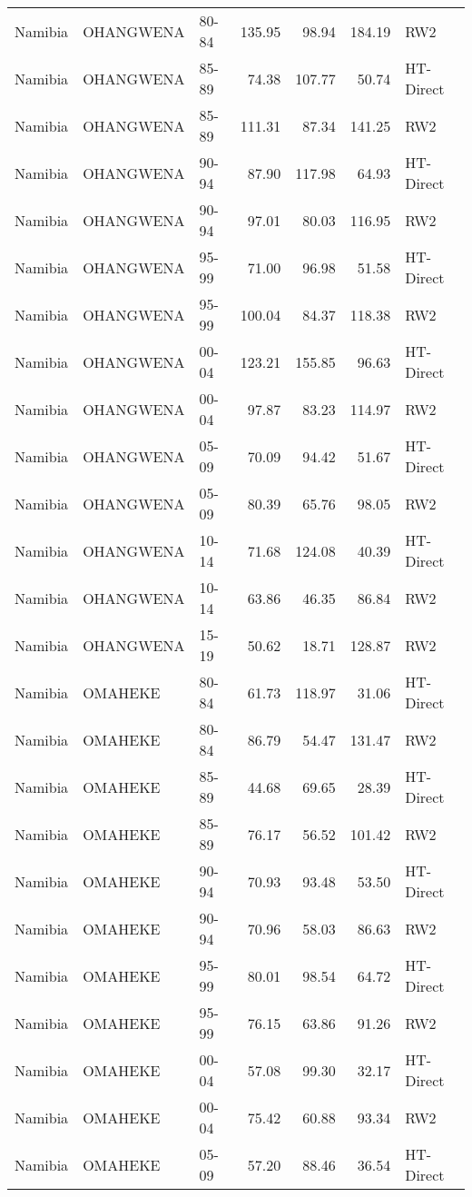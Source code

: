 \begin{longtable}{lllrrrl}
  Namibia & OHANGWENA & 80-84 & 135.95 & 98.94 & 184.19 & RW2 \\ 
  Namibia & OHANGWENA & 85-89 & 74.38 & 107.77 & 50.74 & HT-Direct \\ 
  Namibia & OHANGWENA & 85-89 & 111.31 & 87.34 & 141.25 & RW2 \\ 
  Namibia & OHANGWENA & 90-94 & 87.90 & 117.98 & 64.93 & HT-Direct \\ 
  Namibia & OHANGWENA & 90-94 & 97.01 & 80.03 & 116.95 & RW2 \\ 
  Namibia & OHANGWENA & 95-99 & 71.00 & 96.98 & 51.58 & HT-Direct \\ 
  Namibia & OHANGWENA & 95-99 & 100.04 & 84.37 & 118.38 & RW2 \\ 
  Namibia & OHANGWENA & 00-04 & 123.21 & 155.85 & 96.63 & HT-Direct \\ 
  Namibia & OHANGWENA & 00-04 & 97.87 & 83.23 & 114.97 & RW2 \\ 
  Namibia & OHANGWENA & 05-09 & 70.09 & 94.42 & 51.67 & HT-Direct \\ 
  Namibia & OHANGWENA & 05-09 & 80.39 & 65.76 & 98.05 & RW2 \\ 
  Namibia & OHANGWENA & 10-14 & 71.68 & 124.08 & 40.39 & HT-Direct \\ 
  Namibia & OHANGWENA & 10-14 & 63.86 & 46.35 & 86.84 & RW2 \\ 
  Namibia & OHANGWENA & 15-19 & 50.62 & 18.71 & 128.87 & RW2 \\ 
  Namibia & OMAHEKE & 80-84 & 61.73 & 118.97 & 31.06 & HT-Direct \\ 
  Namibia & OMAHEKE & 80-84 & 86.79 & 54.47 & 131.47 & RW2 \\ 
  Namibia & OMAHEKE & 85-89 & 44.68 & 69.65 & 28.39 & HT-Direct \\ 
  Namibia & OMAHEKE & 85-89 & 76.17 & 56.52 & 101.42 & RW2 \\ 
  Namibia & OMAHEKE & 90-94 & 70.93 & 93.48 & 53.50 & HT-Direct \\ 
  Namibia & OMAHEKE & 90-94 & 70.96 & 58.03 & 86.63 & RW2 \\ 
  Namibia & OMAHEKE & 95-99 & 80.01 & 98.54 & 64.72 & HT-Direct \\ 
  Namibia & OMAHEKE & 95-99 & 76.15 & 63.86 & 91.26 & RW2 \\ 
  Namibia & OMAHEKE & 00-04 & 57.08 & 99.30 & 32.17 & HT-Direct \\ 
  Namibia & OMAHEKE & 00-04 & 75.42 & 60.88 & 93.34 & RW2 \\ 
  Namibia & OMAHEKE & 05-09 & 57.20 & 88.46 & 36.54 & HT-Direct \\ 

\end{longtable}

